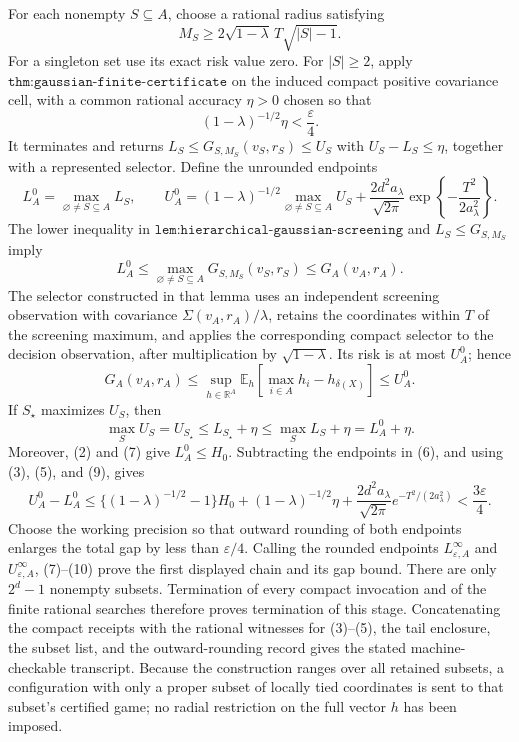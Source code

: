 For each nonempty \(S\subseteq A\), choose a rational radius satisfying
\[
 M_S\geq2\sqrt{1-\lambda}\,T\sqrt{|S|-1}.
\tag{4}
\]
For a singleton set use its exact risk value zero.  For \(|S|\geq2\), apply \(\texttt{thm:gaussian-finite-certificate}\) on the induced compact positive covariance cell, with a common rational accuracy \(\eta>0\) chosen so that
\[
 (1-\lambda)^{-1/2}\eta<\frac{\varepsilon}{4}.
\tag{5}
\]
It terminates and returns \(L_S\leq G_{S,M_S}(v_S,r_S)\leq U_S\) with \(U_S-L_S\leq\eta\), together with a represented selector.  Define the unrounded endpoints
\[
 L_A^0=\max_{\varnothing\ne S\subseteq A}L_S,
 \qquad
 U_A^0=(1-\lambda)^{-1/2}
       \max_{\varnothing\ne S\subseteq A}U_S
       +\frac{2d^2a_\lambda}{\sqrt{2\pi}}
        \exp\!\left\{-\frac{T^2}{2a_\lambda^2}\right\}.
\tag{6}
\]
The lower inequality in \(\texttt{lem:hierarchical-gaussian-screening}\) and \(L_S\leq G_{S,M_S}\) imply
\[
 L_A^0\leq\max_{\varnothing\ne S\subseteq A}G_{S,M_S}(v_S,r_S)\leq G_A(v_A,r_A).
\tag{7}
\]
The selector constructed in that lemma uses an independent screening observation with covariance \(\Sigma(v_A,r_A)/\lambda\), retains the coordinates within \(T\) of the screening maximum, and applies the corresponding compact selector to the decision observation, after multiplication by \(\sqrt{1-\lambda}\).  Its risk is at most \(U_A^0\); hence
\[
 G_A(v_A,r_A)\leq
 \sup_{h\in\mathbb R^A}\mathbb E_h
 \left[\max_{i\in A}h_i-h_{\delta(X)}\right]
 \leq U_A^0.
\tag{8}
\]
If \(S_\star\) maximizes \(U_S\), then
\[
 \max_SU_S=U_{S_\star}\leq L_{S_\star}+\eta
 \leq\max_SL_S+\eta=L_A^0+\eta.
\tag{9}
\]
Moreover, (2) and (7) give \(L_A^0\leq H_0\).  Subtracting the endpoints in (6), and using (3), (5), and (9), gives
\[
 U_A^0-L_A^0
 \leq\{(1-\lambda)^{-1/2}-1\}H_0
 +(1-\lambda)^{-1/2}\eta
 +\frac{2d^2a_\lambda}{\sqrt{2\pi}}e^{-T^2/(2a_\lambda^2)}
 <\frac{3\varepsilon}{4}.
\tag{10}
\]
Choose the working precision so that outward rounding of both endpoints enlarges the total gap by less than \(\varepsilon/4\).  Calling the rounded endpoints \(L^\infty_{\varepsilon,A}\) and \(U^\infty_{\varepsilon,A}\), (7)--(10) prove the first displayed chain and its gap bound.  There are only \(2^d-1\) nonempty subsets.  Termination of every compact invocation and of the finite rational searches therefore proves termination of this stage.  Concatenating the compact receipts with the rational witnesses for (3)--(5), the tail enclosure, the subset list, and the outward-rounding record gives the stated machine-checkable transcript.  Because the construction ranges over all retained subsets, a configuration with only a proper subset of locally tied coordinates is sent to that subset's certified game; no radial restriction on the full vector \(h\) has been imposed.

